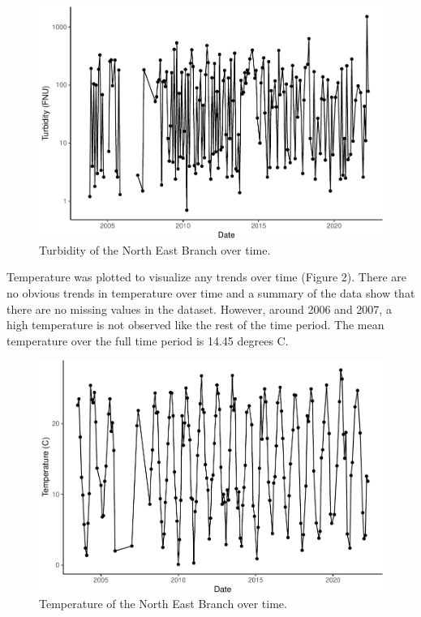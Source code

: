 \documentclass[
  12pt,
]{article}
\begin{document}
\begin{figure}

\includegraphics{Fischer_WDA_FinalProject_files/figure-latex/Turbidity over time-1} \hfill{}

\caption{Turbidity of the North East Branch over time.}\label{fig:Turbidity over time}
\end{figure}

\newpage

Temperature was plotted to visualize any trends over time (Figure 2).
There are no obvious trends in temperature over time and a summary of
the data show that there are no missing values in the dataset. However,
around 2006 and 2007, a high temperature is not observed like the rest
of the time period. The mean temperature over the full time period is
14.45 degrees C.

\begin{figure}

\includegraphics{Fischer_WDA_FinalProject_files/figure-latex/Temperature over time-1} \hfill{}

\caption{Temperature of the North East Branch over time.}\label{fig:Temperature over time}
\end{figure}
\end{document}
